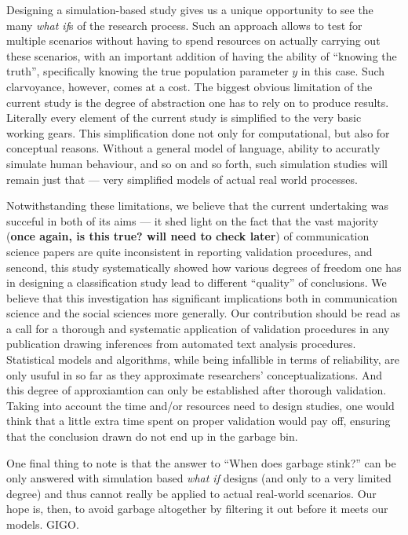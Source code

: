 \documentclass[man, 12pt, a4paper, nolmodern, noextraspace]{apa6}
\begin{document}
Designing a simulation-based study gives us a unique opportunity to see the many \textit{what if}s of the research process. Such an approach allows to test for multiple scenarios without having to spend resources on actually carrying out these scenarios, with an important addition of having the ability of ``knowing the truth'', specifically knowing the true population parameter $y$ in this case. Such clarvoyance, however, comes at a cost. The biggest obvious limitation of the current study is the degree of abstraction one has to rely on to produce results. Literally every element of the current study is simplified to the very basic working gears. This simplification done not only for computational, but also for conceptual reasons. Without a general model of language, ability to accuratly simulate human behaviour, and so on and so forth, such simulation studies will remain just that --- very simplified models of actual real world processes. 


Notwithstanding these limitations, we believe that the current undertaking was succeful in both of its aims --- it shed light on the fact that the vast majority (\textbf{once again, is this true? will need to check later}) of communication science papers are quite inconsistent in reporting validation procedures, and sencond, this study systematically showed how various degrees of freedom one has in designing a classification study lead to different ``quality'' of conclusions. We believe that this investigation has significant implications both in communication science and the social sciences more generally. Our contribution should be read as a call for a thorough and systematic application of validation procedures in any publication drawing inferences from automated text analysis procedures. Statistical models and algorithms, while being infallible in terms of reliability, are only usuful in so far as they approximate researchers' conceptualizations. And this degree of approxiamtion can only be established after thorough validation. Taking into account the time and/or resources need to design studies, one would think that a little extra time spent on proper validation would pay off, ensuring that the conclusion drawn do not end up in the garbage bin.

One final thing to note is that the answer to ``When does garbage stink?'' can be only answered with simulation based \textit{what if} designs (and only to a very limited degree) and thus cannot really be applied to actual real-world scenarios. Our hope is, then, to avoid garbage altogether by filtering it out before it meets our models. GIGO.
    
\end{document}

